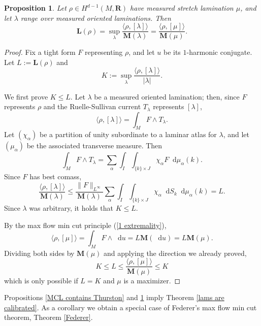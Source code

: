 \documentclass[reqno,11pt]{amsart}
\newcommand{\RR}{\mathbf{R}}
\newcommand*\dif{\mathop{}\!\mathrm{d}}
\newcommand{\Mass}{\mathbf M}
\newcommand{\Comass}{\mathbf L}
\newtheorem{proposition}[theorem]{Proposition}
\theoremstyle{definition}
\numberwithin{equation}{section}
\begin{document}
\begin{proposition}\label{L equals K}
	Let $\rho \in H^{d - 1}(M, \RR)$ have measured stretch lamination $\mu$, and let $\lambda$ range over measured oriented laminations. Then 
	$$\Comass(\rho) = \sup_\lambda \frac{\langle \rho, [\lambda]\rangle}{\Mass(\lambda)} = \frac{\langle \rho, [\mu]\rangle}{\Mass(\mu)}.$$
\end{proposition}
\begin{proof}
Fix a tight form $F$ representing $\rho$, and let $u$ be its $1$-harmonic conjugate.
Let $L := \Comass(\rho)$ and
$$K :=  \sup_\lambda \frac{\langle \rho, [\lambda]\rangle}{|\lambda|}.$$

We first prove $K \leq L$.
Let $\lambda$ be a measured oriented lamination; then, since $F$ represents $\rho$ and the Ruelle-Sullivan current $T_\lambda$ represents $[\lambda]$,
$$\langle \rho, [\lambda]\rangle = \int_M F \wedge T_\lambda.$$
Let $(\chi_\alpha)$ be a partition of unity subordinate to a laminar atlas for $\lambda$, and let $(\mu_\alpha)$ be the associated transverse measure. Then 
$$\int_M F \wedge T_\lambda = \sum_\alpha \int_I \int_{\{k\} \times J} \chi_\alpha F \dif \mu_\alpha(k).$$
Since $F$ has best comass,
$$\frac{\langle \rho, [\lambda] \rangle}{\Mass(\lambda)}
\leq \frac{\|F\|_{L^\infty}}{\Mass(\lambda)} \sum_\alpha \int_I \int_{\{k\} \times J} \chi_\alpha \dif S_k \dif \mu_\alpha(k) = L.$$
Since $\lambda$ was arbitrary, it holds that $K \leq L$.

By the max flow min cut principle (\ref{1 extremality}),
$$\langle \rho, [\mu]\rangle = \int_M F \wedge \dif u = L \Mass(\dif u) = L \Mass(\mu).$$
Dividing both sides by $\Mass(\mu)$ and applying the direction we already proved,
$$K \leq L \leq \frac{\langle \rho, [\mu]\rangle}{\Mass(\mu)} \leq K$$
which is only possible if $L = K$ and $\mu$ is a maximizer.
\end{proof}

Propositions \ref{MCL contains Thurston} and \ref{L equals K} imply Theorem \ref{lams are calibrated}.
As a corollary we obtain a special case of Federer's max flow min cut theorem, Theorem \ref{Federer}.
\end{document}
